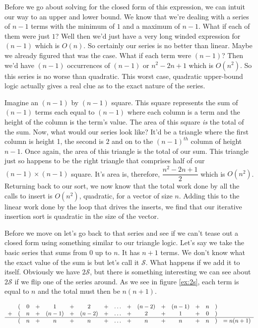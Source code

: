 \documentclass[]{tufte-handout}
\begin{document}
Before we go about solving for the closed form of this expression, we can intuit our way to an upper and lower bound.  We know that we're dealing with a series of $n-1$ terms with the minimum of $1$ and a maximum of $n-1$. What if each of them were just $1$? Well then we'd just have a very long winded expression for $(n-1)$ which is $O(n)$. So certainly our series is no better than linear. Maybe we already figured that was the case. What if each term were $(n-1)$? Then we'd have $(n-1)$ occurrences of $(n-1)$ or $n^2-2n+1$ which is $O(n^2)$. So this series is no worse than quadratic. This worst case, quadratic upper-bound logic actually gives a real clue as to the exact nature of the series. 

Imagine an $(n-1)$ by $(n-1)$ square. This square represents the sum of $(n-1)$ terms each equal to $(n-1)$ where each column is a term and the height of the column is the term's value. The area of this square \textit{is} the total of the sum. Now, what would our series look like? It'd be a triangle where the first column is height 1, the second is $2$ and on to the $(n-1)^{th}$ column of height $n-1$. Once again, the area of this triangle is the total of our sum. This triangle just so happens to be the right triangle that comprises half of our $(n-1)\times(n-1)$ square. It's area is, therefore, $\dfrac{n^2-2n+1}{2}$ which is $O(n^2)$. Returning back to our sort, we now know that the total work done by all the calls to insert is $O(n^2)$, quadratic, for a vector of size $n$. Adding this to the linear work done by the loop that drives the inserts, we find that our iterative insertion sort is quadratic in the size of the vector.

Before we move on let's go back to that series and see if we can't tease out a closed form using something similar to our triangle logic. Let's say we take the basic series that sums from $0$ up to $n$. It has $n+1$ terms.  We don't know what the exact value of the sum is but let's call it $\mathcal{S}$. What happens if we add it to itself. Obviously we have $2\mathcal{S}$, but there is something interesting we can see about $2\mathcal{S}$ if we flip one of the series around. As we see in figure \ref{ex:2s}, each term is equal to $n$ and the total must then be $n(n+1)$.
\begin{figure*}[!htpb]
\[
\begin{array}{ccccccccccccccccc}
  &(& 0 & + & 1     & + & 2    & + & \ldots & + & (n-2) & + & (n-1) & + & n & ) & \\
+ &(& n & + & (n-1) & + & (n-2)& + & \ldots & + & 2     & + & 1     & + & 0 & ) & \\ \hline
  &(& n & + & n     & + & n    & + & \ldots & + & n     & + & n     & + & n & ) & = n(n+1)
\end{array}
\]
\caption{Adding $\mathcal{S}$ to itself}
\label{ex:2s}
\end{figure*}
\end{document}
